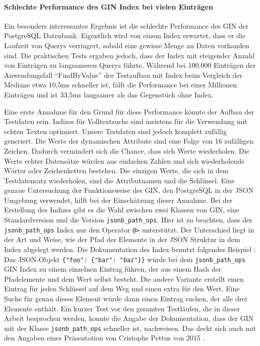 \paragraph{Schlechte Performance des GIN Index bei vielen Einträgen}

Ein besonders interessantes Ergebnis ist die schlechte Performance des \acf{GIN} der PostgreSQL Datenbank. Eigentlich wird von einem Index erwartet, dass er die Laufzeit von Querys verringert, sobald eine gewisse Menge an Daten vorhanden sind. Die praktischen Tests ergaben jedoch, dass der Index mit steigender Anzahl von Einträgen zu langsameren Querys führte. Während bei 100.000 Einträgen der Anwendungsfall ``FindByValue'' der Testaufbau mit Index beim Vergleich der Mediane etwa 10,5ms schneller ist, fällt die Performance bei einer Millionen Einträgen und ist 33,5ms langsamer als das Gegenstück ohne Index.

Eine erste Annahme für den Grund für diese Performance könnte der Aufbau der Testdaten sein. Indizes für Volltextsuche sind meistens für die Verwendung mit echten Texten optimiert. Unsere Testdaten sind jedoch komplett zufällig generiert. Die Werte der dynamischen Attribute sind eine Folge von 16 zufälligen Zeichen.  Dadurch vermindert sich die Chance, dass sich Werte wiederholen. Die Werte echter Datensätze würden aus einfachen Zahlen und sich wiederholende Wörter oder Zeichenketten bestehen. Die einzigen Werte, die sich in dem Testdatensatz wiederholen, sind die Attributnamen und die Schlüssel. Eine genaue Untersuchung der Funktionsweise des \ac{GIN}, den PostgreSQL in der JSON Umgebung verwendet, hilft bei der Einschätzung dieser Annahme. Bei der Erstellung des Indizes gibt es die Wahl zwischen zwei Klassen von \ac{GIN}, eine Standardversion und die Version \lstinline|jsonb_path_ops|. Hier ist zu beachten, dass der  \lstinline|jsonb_path_ops| Index nur den Operator \lstinline|@>| unterstützt. Der Unterschied liegt in der Art und Weise, wie der Pfad der Elemente in der JSON Struktur in dem Index abgelegt werden. Die Dokumentation des Index benutzt folgendes Beispiel \cite{PostgreSQLDocumentation.2021}: Das JSON-Objekt \lstinline|{"foo": {"bar": "baz"}}| würde bei dem \lstinline|jsonb_path_ops| GIN Index zu einem einzelnen Eintrag führen, der aus einem Hash der Pfadelemente und dem Wert selbst besteht. Die andere Variante erstellt einen Eintrag für jeden Schlüssel auf dem Weg und einen extra für den Wert. Eine Suche für genau dieses Element würde dann einen Eintrag suchen, der alle drei Elemente enthält.
Ein kurzer Test vor den gesamten Testläufen, die in dieser Arbeit besprochen werden, konnte die Angabe der Dokumentation, dass der \ac{GIN} mit der Klasse \lstinline|jsonb_path_ops| schneller ist, nachweisen. Das deckt sich auch mit den Angaben einer Präsentation von Cristophe Pettus von 2015 \cite{PettusChristophe.2015}.

